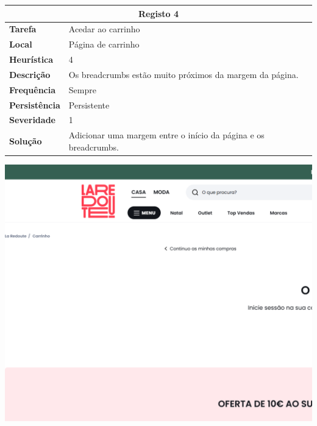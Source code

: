 \documentclass[a4paper,12pt]{article}
\begin{document}
\begin{center}
\newpage
    \begin{table}[h!]
        \centering
        \begin{tabular}{|m{3cm}|m{12cm}|}
        \hline
        \multicolumn{2}{|c|}{\textbf{Registo 4}} \\ \hline
        \textbf{Tarefa}       & Acedar ao carrinho \\ \hline
        \textbf{Local}        & Página de carrinho \\ \hline
        \textbf{Heurística}   & 4  \\ \hline
        \textbf{Descrição}    & Os breadcrumbs estão muito próximos da margem da página. \\ \hline
        \textbf{Frequência}   & Sempre \\ \hline
        \textbf{Persistência} & Persistente \\ \hline
        \textbf{Severidade}   & 1 \\ \hline
        \textbf{Solução}      & Adicionar uma margem entre o início da página e os breadcrumbs. \\ \hline
        \end{tabular}
    \end{table}
    
    \vspace{0.5cm}
    \includegraphics[width=\textwidth, keepaspectratio]{heuristics/03breadcrumbs_carrinho.png}


\end{center}
\end{document}
